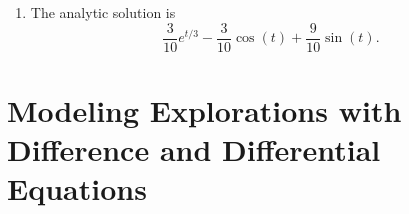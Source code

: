 \begin{example}
\begin{enumerate}
\[\begin{array}{ccc|c}
                    1 & 1 & 0 & 0 \\ 
                    0 & 1 & 1/3 & 0 \\ 
                    0 & 1/3 & -1 & -1 \end{array} \right) \to 
                \left( \begin{array}{ccc|c}  
                    1 & 0 & -1/3 & 0 \\ 
                    0 & 1 & 1/3 & 0 \\ 
                    0 & 0 & -10/9 & -1 \end{array} \right) \to 
                \left( \begin{array}{ccc|c}  
                    1 & 0 & 0 & 3/10 \\ 
                    0 & 1 & 0 & -3/10 \\ 
                    0 & 0 & 1 & 9/10 \end{array} \right).
            \]
        \item The analytic solution is
            \[ \frac{3}{10} e^{t/3} - \frac{3}{10} \cos(t) + \frac{9}{10} \sin(t). \]
    \end{enumerate}
\end{example}




\section{Modeling Explorations with Difference and Differential Equations}

